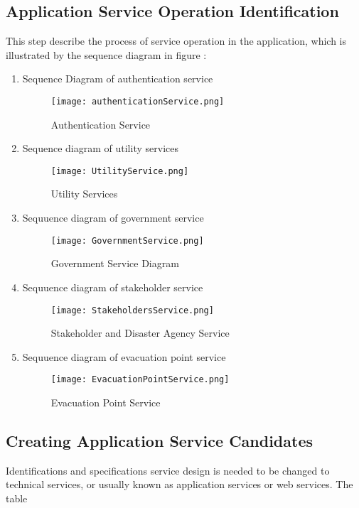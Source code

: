 \subsection{Application Service Operation Identification}
This step describe the process of service operation in the application, which is 
illustrated by the sequence diagram in figure :

\begin{enumerate}
\setlength{\itemsep}{1.5pt}
\setlength{\parskip}{1.5pt}
\item Sequence Diagram of authentication service
\begin{figure}[H]
\centering
\texttt{[image: authenticationService.png]}
\label{fig:AutService}
\caption{Authentication Service}
\end{figure}

\item Sequence diagram of utility services
\begin{figure}[H]
\centering
\texttt{[image: UtilityService.png]}
\label{fig:UtiService}
\caption{Utility Services}
\end{figure}

\item Sequuence diagram of government service
\begin{figure}[H]
\centering
\texttt{[image: GovernmentService.png]}
\label{fig:GovService}
\caption{Government Service Diagram}
\end{figure}

\item Sequuence diagram of stakeholder service
\begin{figure}[H]
\centering
\texttt{[image: StakeholdersService.png]}
\label{fig:StkService}
\caption{Stakeholder and Disaster Agency Service}
\end{figure}

\item Sequuence diagram of evacuation point service
\begin{figure}[H]
\centering
\texttt{[image: EvacuationPointService.png]}
\label{fig:EvaPointService}
\caption{Evacuation Point Service}
\end{figure}
\end{enumerate}

\subsection{Creating Application Service Candidates}
Identifications and specifications service design is needed to be changed to technical services, or usually known as application services or web services. The table 

